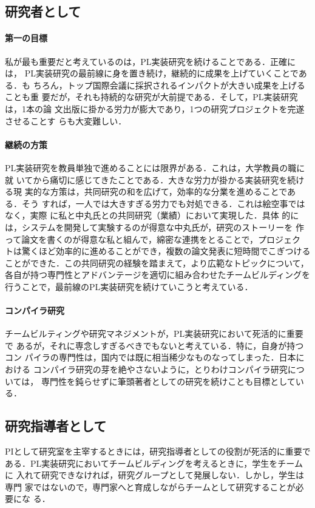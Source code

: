 \documentclass[dvipdfmx]{jsarticle}
\begin{document}
\subsection*{研究者として}

\paragraph{第一の目標}
私が最も重要だと考えているのは，PL実装研究を続けることである．正確には，
PL実装研究の最前線に身を置き続け，継続的に成果を上げていくことである．も
ちろん，トップ国際会議に採択されるインパクトが大きい成果を上げることも重
要だが，それも持続的な研究が大前提である．そして，PL実装研究は，1本の論
文出版に掛かる労力が膨大であり，1つの研究プロジェクトを完遂させることす
らも大変難しい．

\paragraph{継続の方策}
PL実装研究を教員単独で進めることには限界がある．これは，大学教員の職に就
いてから痛切に感じてきたことである．大きな労力が掛かる実装研究を続ける現
実的な方策は，共同研究の和を広げて，効率的な分業を進めることである．そう
すれば，一人では大きすぎる労力でも対処できる．これは絵空事ではなく，実際
に私と中丸氏との共同研究（業績\cite{splash22:mvnb,ppl23:notebook}）において実現した．具体
的には，システムを開発して実験するのが得意な中丸氏が，研究のストーリーを
作って論文を書くのが得意な私と組んで，綿密な連携をとることで，プロジェク
トは驚くほど効率的に進めることができ，複数の論文発表に短時間でこぎつける
ことができた．この共同研究の経験を踏まえて，より広範なトピックについて，
各自が持つ専門性とアドバンテージを適切に組み合わせたチームビルディングを
行うことで，最前線のPL実装研究を続けていこうと考えている．

\paragraph{コンパイラ研究}
チームビルティングや研究マネジメントが，PL実装研究において死活的に重要で
あるが，それに専念しすぎるべきでもないと考えている．特に，自身が持つコン
パイラの専門性は，国内では既に相当稀少なものなってしまった．日本における
コンパイラ研究の芽を絶やさないように，とりわけコンパイラ研究については，
専門性を鈍らせずに筆頭著者としての研究を続けことも目標としている．

\subsection*{研究指導者として}
PIとして研究室を主宰するときには，研究指導者としての役割が死活的に重要で
ある．PL実装研究においてチームビルディングを考えるときに，学生をチームに
入れて研究できなければ，研究グループとして発展しない．しかし，学生は専門
家ではないので，専門家へと育成しながらチームとして研究することが必要にな
る．
\end{document}
